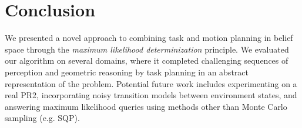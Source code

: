 \section{Conclusion}
We presented a novel approach to combining task and motion planning
in belief space through the \emph{maximum likelihood determinization}
principle. We evaluated our algorithm on several domains, where it completed
challenging sequences of perception and geometric reasoning by task planning in
an abstract representation of the problem. Potential future work includes experimenting on a real PR2, incorporating noisy transition models between environment states, and answering maximum likelihood queries using methods other than Monte Carlo sampling (e.g. SQP).